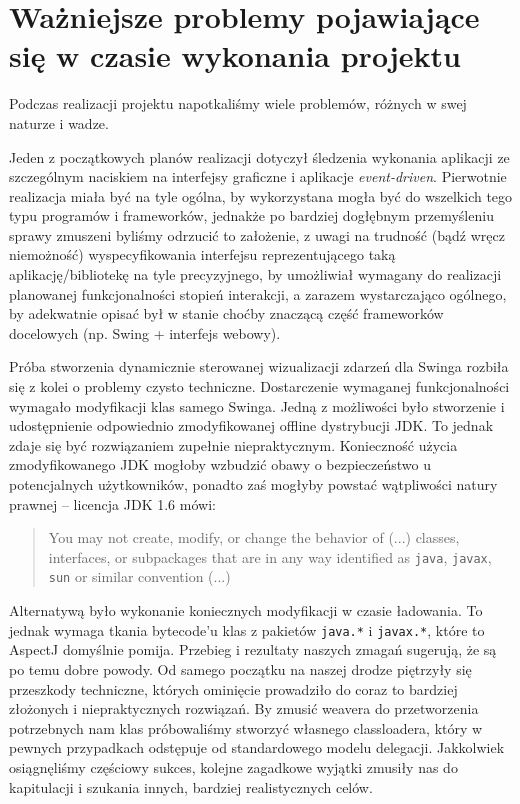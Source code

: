 \documentclass[12pt,a4paper,titlepage]{article}
\begin{document}
\section[Problemy]{Ważniejsze problemy pojawiające się w czasie wykonania projektu}
  Podczas realizacji projektu napotkaliśmy wiele problemów, różnych w swej naturze i wadze.

    Jeden z początkowych planów realizacji dotyczył śledzenia wykonania aplikacji ze szczególnym naciskiem na interfejsy graficzne i aplikacje \textit{event-driven}. Pierwotnie realizacja miała być na tyle ogólna, by wykorzystana mogła być do wszelkich tego typu programów i frameworków, jednakże po bardziej dogłębnym przemyśleniu sprawy zmuszeni byliśmy odrzucić to założenie, z uwagi na trudność (bądź wręcz niemożność) wyspecyfikowania interfejsu reprezentującego taką aplikację/bibliotekę na tyle precyzyjnego, by umożliwiał wymagany do realizacji planowanej funkcjonalności stopień interakcji, a zarazem wystarczająco ogólnego, by adekwatnie opisać był w stanie choćby znaczącą część frameworków docelowych (np. Swing + interfejs webowy).

    Próba stworzenia dynamicznie sterowanej wizualizacji zdarzeń dla Swinga rozbiła się z kolei o problemy czysto techniczne. Dostarczenie wymaganej funkcjonalności wymagało modyfikacji klas samego Swinga. Jedną z możliwości było stworzenie i udostępnienie odpowiednio zmodyfikowanej offline dystrybucji JDK. To jednak zdaje się być rozwiązaniem zupełnie niepraktycznym. Konieczność użycia zmodyfikowanego JDK mogłoby wzbudzić obawy o bezpieczeństwo u potencjalnych użytkowników, ponadto zaś mogłyby powstać wątpliwości natury prawnej -- licencja JDK 1.6 mówi:

\begin{quote}
You may not  create,  modify,  or
change the behavior of (...) classes,  interfaces, or  subpackages  that
are in any  way  identified  as  \texttt{java},  \texttt{javax},  \texttt{sun}  or  similar
convention (...)
\end{quote}

Alternatywą było wykonanie koniecznych modyfikacji w czasie ładowania. To jednak wymaga tkania bytecode'u klas z pakietów \texttt{java.*} i \texttt{javax.*}, które to AspectJ domyślnie pomija. Przebieg i rezultaty naszych zmagań sugerują, że są po temu dobre powody. Od samego początku na naszej drodze piętrzyły się przeszkody techniczne, których ominięcie prowadziło do coraz to bardziej złożonych i niepraktycznych rozwiązań. By zmusić weavera do przetworzenia potrzebnych nam klas próbowaliśmy stworzyć własnego classloadera, który w pewnych przypadkach odstępuje od standardowego modelu delegacji. Jakkolwiek osiągnęliśmy częściowy sukces, kolejne zagadkowe wyjątki zmusiły nas do kapitulacji i szukania innych, bardziej realistycznych celów.
\end{document}

